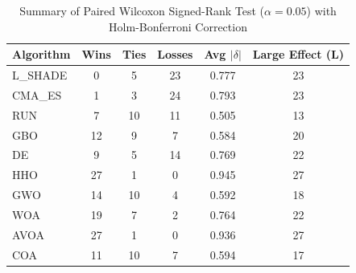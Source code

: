\begin{table}[!t]
\centering\small
\caption{Summary of Paired Wilcoxon Signed-Rank Test ($\alpha=0.05$) with Holm-Bonferroni Correction}
\label{tab:summary_stats}
\begin{tabular}{l|c|c|c|c|c}
\hline
Algorithm & Wins & Ties & Losses & Avg $|\delta|$ & Large Effect (L) \\\hline\hline
L_SHADE & 0 & 5 & 23 & 0.777 & 23 \\\hline
CMA_ES & 1 & 3 & 24 & 0.793 & 23 \\\hline
RUN & 7 & 10 & 11 & 0.505 & 13 \\\hline
GBO & 12 & 9 & 7 & 0.584 & 20 \\\hline
DE & 9 & 5 & 14 & 0.769 & 22 \\\hline
HHO & 27 & 1 & 0 & 0.945 & 27 \\\hline
GWO & 14 & 10 & 4 & 0.592 & 18 \\\hline
WOA & 19 & 7 & 2 & 0.764 & 22 \\\hline
AVOA & 27 & 1 & 0 & 0.936 & 27 \\\hline
COA & 11 & 10 & 7 & 0.594 & 17 \\\hline
\end{tabular}
\end{table}
